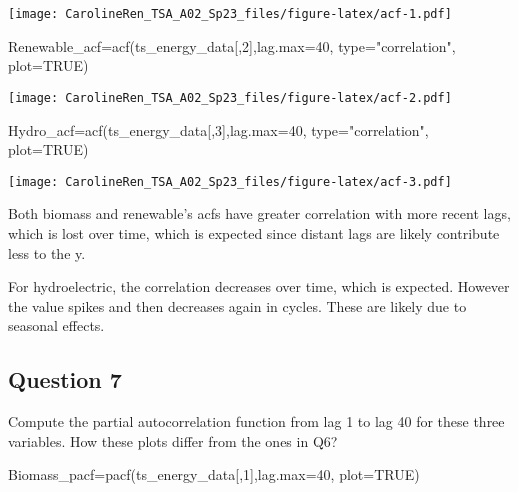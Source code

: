 \documentclass[
]{article}
\newenvironment{Shaded}{\begin{snugshade}}{\end{snugshade}}
\newcommand{\AttributeTok}[1]{\textcolor[rgb]{0.77,0.63,0.00}{#1}}
\newcommand{\ConstantTok}[1]{\textcolor[rgb]{0.00,0.00,0.00}{#1}}
\newcommand{\DecValTok}[1]{\textcolor[rgb]{0.00,0.00,0.81}{#1}}
\newcommand{\FunctionTok}[1]{\textcolor[rgb]{0.00,0.00,0.00}{#1}}
\newcommand{\NormalTok}[1]{#1}
\newcommand{\OtherTok}[1]{\textcolor[rgb]{0.56,0.35,0.01}{#1}}
\newcommand{\StringTok}[1]{\textcolor[rgb]{0.31,0.60,0.02}{#1}}
\begin{document}
\texttt{[image: CarolineRen\_TSA\_A02\_Sp23\_files/figure-latex/acf-1.pdf]}

\begin{Shaded}
\begin{Highlighting}[]
\NormalTok{Renewable\_acf}\OtherTok{=}\FunctionTok{acf}\NormalTok{(ts\_energy\_data[,}\DecValTok{2}\NormalTok{],}\AttributeTok{lag.max=}\DecValTok{40}\NormalTok{, }\AttributeTok{type=}\StringTok{"correlation"}\NormalTok{, }\AttributeTok{plot=}\ConstantTok{TRUE}\NormalTok{)}
\end{Highlighting}
\end{Shaded}

\texttt{[image: CarolineRen\_TSA\_A02\_Sp23\_files/figure-latex/acf-2.pdf]}

\begin{Shaded}
\begin{Highlighting}[]
\NormalTok{Hydro\_acf}\OtherTok{=}\FunctionTok{acf}\NormalTok{(ts\_energy\_data[,}\DecValTok{3}\NormalTok{],}\AttributeTok{lag.max=}\DecValTok{40}\NormalTok{, }\AttributeTok{type=}\StringTok{"correlation"}\NormalTok{, }\AttributeTok{plot=}\ConstantTok{TRUE}\NormalTok{)}
\end{Highlighting}
\end{Shaded}

\texttt{[image: CarolineRen\_TSA\_A02\_Sp23\_files/figure-latex/acf-3.pdf]}

Both biomass and renewable's acfs have greater correlation with more
recent lags, which is lost over time, which is expected since distant
lags are likely contribute less to the y.

For hydroelectric, the correlation decreases over time, which is
expected. However the value spikes and then decreases again in cycles.
These are likely due to seasonal effects.

\hypertarget{question-7}{%
\subsection{Question 7}\label{question-7}}

Compute the partial autocorrelation function from lag 1 to lag 40 for
these three variables. How these plots differ from the ones in Q6?

\begin{Shaded}
\begin{Highlighting}[]
\NormalTok{Biomass\_pacf}\OtherTok{=}\FunctionTok{pacf}\NormalTok{(ts\_energy\_data[,}\DecValTok{1}\NormalTok{],}\AttributeTok{lag.max=}\DecValTok{40}\NormalTok{, }\AttributeTok{plot=}\ConstantTok{TRUE}\NormalTok{)}
\end{Highlighting}
\end{Shaded}
\end{document}
